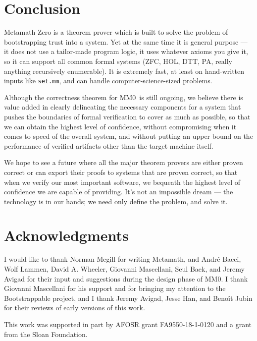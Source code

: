 \documentclass[runningheads]{llncs}
\newcommand{\mmO}{\textsf{MM0}}
\begin{document}
\section{Conclusion}\label{sec:conclusion}
Metamath Zero is a theorem prover which is built to solve the problem of bootstrapping trust into a system. Yet at the same time it is general purpose --- it does not use a tailor-made program logic, it uses whatever axioms you give it, so it can support all common formal systems (ZFC, HOL, DTT, PA, really anything recursively enumerable). It is extremely fast, at least on hand-written inputs like \texttt{set.mm}, and can handle computer-science-sized problems.

Although the correctness theorem for \mmO\ is still ongoing, we believe there is value added in clearly delineating the necessary components for a system that pushes the boundaries of formal verification to cover as much as possible, so that we can obtain the highest level of confidence, without compromising when it comes to speed of the overall system, and without putting an upper bound on the performance of verified artifacts other than the target machine itself.

We hope to see a future where all the major theorem provers are either proven correct or can export their proofs to systems that are proven correct, so that when we verify our most important software, we bequeath the highest level of confidence we are capable of providing. It's not an impossible dream --- the technology is in our hands; we need only define the problem, and solve it.

\section*{Acknowledgments}
I would like to thank Norman Megill for writing Metamath, and Andr\'{e} Bacci, Wolf Lammen, David A. Wheeler, Giovanni Mascellani, Seul Baek, and Jeremy Avigad for their input and suggestions during the design phase of MM0. I thank Giovanni Mascellani for his support and for bringing my attention to the Bootstrappable project, and I thank Jeremy Avigad, Jesse Han, and Beno\^{i}t Jubin for their reviews of early versions of this work.

This work was supported in part by AFOSR grant FA9550-18-1-0120 and a grant from the Sloan Foundation.



\end{document}
